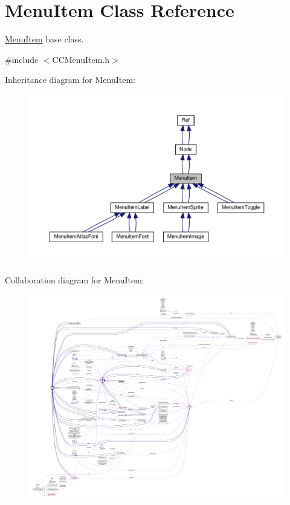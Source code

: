 \hypertarget{classMenuItem}{}\section{Menu\+Item Class Reference}
\label{classMenuItem}


\hyperlink{classMenuItem}{Menu\+Item} base class.  




{\ttfamily \#include $<$C\+C\+Menu\+Item.\+h$>$}



Inheritance diagram for Menu\+Item\+:
\nopagebreak
\begin{figure}[H]
\begin{center}
\leavevmode
\includegraphics[width=350pt]{classMenuItem__inherit__graph}
\end{center}
\end{figure}


Collaboration diagram for Menu\+Item\+:
\nopagebreak
\begin{figure}[H]
\begin{center}
\leavevmode
\includegraphics[width=350pt]{classMenuItem__coll__graph}
\end{center}
\end{figure}
